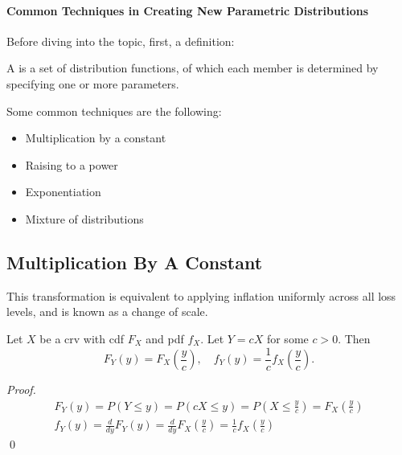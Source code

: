 \documentclass[notoc,notitlepage]{tufte-book}
\begin{document}
\paragraph{Common Techniques in Creating New Parametric Distributions} Before diving into the topic, first, a definition:

\begin{defn}\label{defn:parametric_distribution}
  A  is a set of distribution functions, of which each member is determined by specifying one or more parameters.
\end{defn}

Some common techniques are the following:
\begin{itemize}
  \item Multiplication by a constant
  \item Raising to a power
  \item Exponentiation
  \item Mixture of distributions
\end{itemize}

\subsection{Multiplication By A Constant}%
\label{sub:multiplication_by_a_constant}

This transformation is equivalent to applying inflation uniformly across all loss levels, and is known as a change of scale.

\begin{propo}\label{propo:multiplication_by_a_constant}
  Let $X$ be a crv with cdf $F_X$ and pdf $f_X$. Let $Y = cX$ for some $c > 0$. Then
  \begin{equation*}
    F_Y(y) = F_X\left( \frac{y}{c} \right), \quad f_Y(y) = \frac{1}{c}f_X\left( \frac{y}{c} \right).
  \end{equation*}
\end{propo}

\begin{proof}
  \begin{gather*}
    F_Y(y) = P(Y \leq y) = P( cX \leq y ) = P\left( X \leq \frac{y}{c} \right) = F_X\left( \frac{y}{c} \right) \\
    f_Y(y) = \frac{d}{dy} F_Y(y) = \frac{d}{dy} F_X\left( \frac{y}{c} \right) = \frac{1}{c}f_X\left( \frac{y}{c} \right)
  \end{gather*}\qed\
\end{proof}
\end{document}
